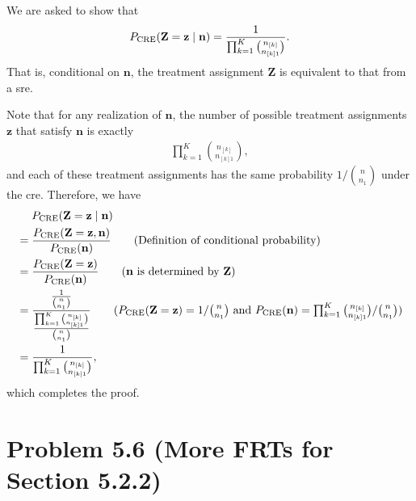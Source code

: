 \documentclass[10pt]{article}
\begin{document}
We are asked to show that
\begin{align*}
  P_{\text{CRE}}{\left( \mathbf{Z} = \mathbf{z} \mid \mathbf{n} \right)}
  = \frac{1}{\prod_{k=1}^K \binom{n_{[k]}}{n_{[k]1}}}.
\end{align*}
That is, conditional on $\mathbf{n}$,
the treatment assignment $\mathbf{Z}$ is equivalent to that from a \gls{sre}.

Note that
for any realization of $\mathbf{n}$,
the number of possible treatment assignments $\mathbf{z}$
that satisfy $\mathbf{n}$ is exactly
\begin{align*}
  \prod_{k=1}^K \binom{n_{[k]}}{n_{[k]1}},
\end{align*}
and each of these treatment assignments
has the same probability $1/\binom{n}{n_1}$
under the \gls{cre}.
Therefore, we have
\begin{align*}
  &\mathrel{\phantom{=}} P_{\text{CRE}}\bp{\mathbf{Z} = \mathbf{z} \mid \mathbf{n}} \\
  &= \frac{P_{\text{CRE}}\bp{\mathbf{Z} = \mathbf{z}, \mathbf{n}}}{P_{\text{CRE}}\bp{\mathbf{n}}} \tag{Definition of conditional probability} \\
  &= \frac{P_{\text{CRE}}\bp{\mathbf{Z} = \mathbf{z}}}{P_{\text{CRE}}\bp{\mathbf{n}}} \tag{$\mathbf{n}$ is determined by $\mathbf{Z}$} \\
  &= \frac{\frac{1}{\binom{n}{n_1}}}{\frac{\prod_{k=1}^K \binom{n_{[k]}}{n_{[k]1}}}{\binom{n}{n_1}}} 
    \tag{$P_{\text{CRE}}\bp{\mathbf{Z} = \mathbf{z}} = 1/\binom{n}{n_1}$ and $P_{\text{CRE}}\bp{\mathbf{n}} = {\prod_{k=1}^K \binom{n_{[k]}}{n_{[k]1}}}/{\binom{n}{n_1}}$} \\
  &= \frac{1}{\prod_{k=1}^K \binom{n_{[k]}}{n_{[k]1}}},
\end{align*}
which completes the proof.


\section*{Problem 5.6 (More FRTs for Section 5.2.2)}

\printglossaries
\end{document}
